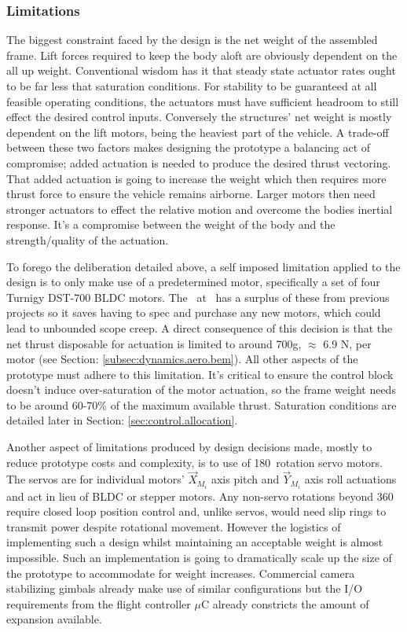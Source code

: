 \subsubsection{Limitations}
\label{subsubsec:intro.foreword.limits}
The biggest constraint faced by the design is the net weight of the assembled frame. Lift forces required to keep the body aloft are obviously dependent on the all up weight. Conventional wisdom has it that steady state actuator rates ought to be far less that saturation conditions. For stability to be guaranteed at all feasible operating conditions, the actuators must have sufficient headroom to still effect the desired control inputs. Conversely the structures' net weight is mostly dependent on the lift motors, being the heaviest part of the vehicle. A trade-off between these two factors makes designing the prototype a balancing act of compromise; added actuation is needed to produce the desired thrust vectoring. That added actuation is going to increase the weight which then requires more thrust force to ensure the vehicle remains airborne. Larger motors then need stronger actuators to effect the relative motion and overcome the bodies inertial response. It's a compromise between the weight of the body and the strength/quality of the actuation.
\par
To forego the deliberation detailed above, a self imposed limitation applied to the design is to only make use of a predetermined motor, specifically a set of four Turnigy DST-700 BLDC motors. The \dept ~at \uni ~has a surplus of these from previous projects so it saves having to spec and purchase any new motors, which could lead to unbounded scope creep. A direct consequence of this decision is that the net thrust disposable for actuation is limited to around 700g, $\approx$ 6.9 N, per motor (see Section: \ref{subsec:dynamics.aero.bem}). All other aspects of the prototype must adhere to this limitation. It's critical to ensure the control block doesn't induce over-saturation of the motor actuation, so the frame weight needs to be around 60-70\% of the maximum available thrust. Saturation conditions are detailed later in Section: \ref{sec:control.allocation}.
\par
Another aspect of limitations produced by design decisions made, mostly to reduce prototype costs and complexity, is to use of 180\textdegree ~rotation servo motors. The servos are for individual motors' $\vec{X}_{M_i}$ axis pitch and $\vec{Y}_{M_i}$ axis roll actuations and act in lieu of BLDC or stepper motors. Any non-servo rotations beyond 360\textdegree~ require closed loop position control and, unlike servos, would need slip rings to transmit power despite rotational movement. However the logistics of implementing such a design whilst maintaining an acceptable weight is almost impossible. Such an implementation is going to dramatically scale up the size of the prototype to accommodate for weight increases. Commercial camera stabilizing gimbals already make use of similar configurations but the I/O requirements from the flight controller $\mu$C already constricts the amount of expansion available.
